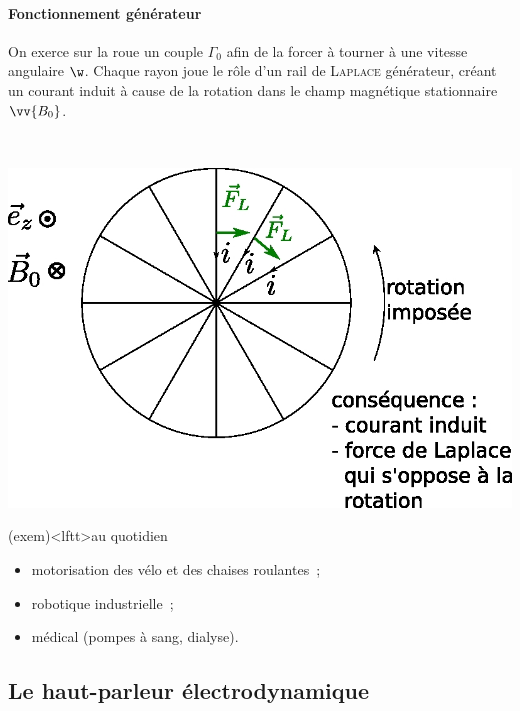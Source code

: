 \documentclass[../../main/main.tex]{subfiles}
\begin{document}
\noindent
\begin{minipage}[c]{.65\linewidth}
	\paragraph*{Fonctionnement générateur} On exerce sur la roue un couple
	$\Gamma_0$ afin de la forcer à tourner à une vitesse angulaire $\w$.
	\smallbreak
	Chaque rayon joue le rôle d'un rail de \textsc{Laplace} générateur, créant un
	courant induit à cause de la rotation dans le champ magnétique stationnaire
	$\vv{B_0}$.
\end{minipage}
\hfill
\begin{minipage}[c]{.30\linewidth}
	~
	\begin{center}
		\includegraphics[width=\linewidth]{mot_entrefer-gene}
		\label{fig:motentrehene}
	\end{center}
\end{minipage}

\begin{tcb}(exem)<lftt>{au quotidien}
	\begin{itemize}
		\item motorisation des vélo et des chaises roulantes~;
		\item robotique industrielle~;
		\item médical (pompes à sang, dialyse).
	\end{itemize}
\end{tcb}

\subsection{Le haut-parleur électrodynamique}
\label{ssec:hpelectro}
\end{document}
